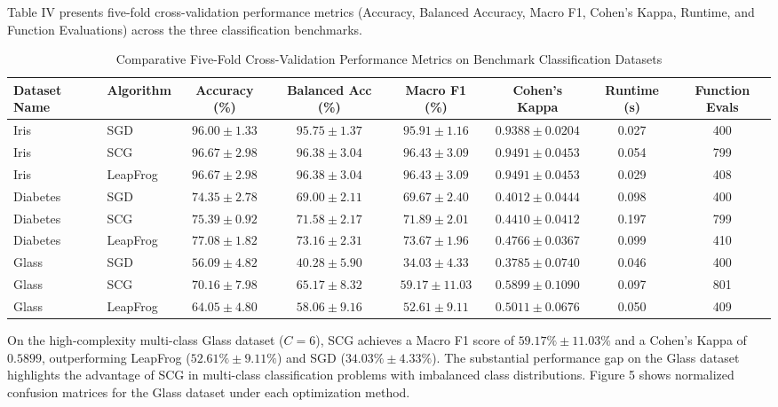 \documentclass[10pt, conference]{IEEEtran}
\begin{document}
Table IV presents five-fold cross-validation performance metrics (Accuracy, Balanced Accuracy, Macro F1, Cohen's Kappa, Runtime, and Function Evaluations) across the three classification benchmarks.

\begin{table}[t]
\caption{Comparative Five-Fold Cross-Validation Performance Metrics on Benchmark Classification Datasets}
\label{tab:cls_results}
\centering
\begin{tabular}{llcccccc}
\toprule
Dataset Name & Algorithm & Accuracy (\%) & Balanced Acc (\%) & Macro F1 (\%) & Cohen's Kappa & Runtime (s) & Function Evals \\
\midrule
Iris & SGD & $96.00 \pm 1.33$ & $95.75 \pm 1.37$ & $95.91 \pm 1.16$ & $0.9388 \pm 0.0204$ & 0.027 & 400 \\
Iris & SCG & $96.67 \pm 2.98$ & $96.38 \pm 3.04$ & $96.43 \pm 3.09$ & $0.9491 \pm 0.0453$ & 0.054 & 799 \\
Iris & LeapFrog & $96.67 \pm 2.98$ & $96.38 \pm 3.04$ & $96.43 \pm 3.09$ & $0.9491 \pm 0.0453$ & 0.029 & 408 \\
\midrule
Diabetes & SGD & $74.35 \pm 2.78$ & $69.00 \pm 2.11$ & $69.67 \pm 2.40$ & $0.4012 \pm 0.0444$ & 0.098 & 400 \\
Diabetes & SCG & $75.39 \pm 0.92$ & $71.58 \pm 2.17$ & $71.89 \pm 2.01$ & $0.4410 \pm 0.0412$ & 0.197 & 799 \\
Diabetes & LeapFrog & $77.08 \pm 1.82$ & $73.16 \pm 2.31$ & $73.67 \pm 1.96$ & $0.4766 \pm 0.0367$ & 0.099 & 410 \\
\midrule
Glass & SGD & $56.09 \pm 4.82$ & $40.28 \pm 5.90$ & $34.03 \pm 4.33$ & $0.3785 \pm 0.0740$ & 0.046 & 400 \\
Glass & SCG & $70.16 \pm 7.98$ & $65.17 \pm 8.32$ & $59.17 \pm 11.03$ & $0.5899 \pm 0.1090$ & 0.097 & 801 \\
Glass & LeapFrog & $64.05 \pm 4.80$ & $58.06 \pm 9.16$ & $52.61 \pm 9.11$ & $0.5011 \pm 0.0676$ & 0.050 & 409 \\
\bottomrule
\end{tabular}
\end{table}

On the high-complexity multi-class Glass dataset ($C = 6$), SCG achieves a Macro F1 score of $59.17\% \pm 11.03\%$ and a Cohen's Kappa of $0.5899$, outperforming LeapFrog ($52.61\% \pm 9.11\%$) and SGD ($34.03\% \pm 4.33\%$). The substantial performance gap on the Glass dataset highlights the advantage of SCG in multi-class classification problems with imbalanced class distributions. Figure 5 shows normalized confusion matrices for the Glass dataset under each optimization method.
\end{document}
